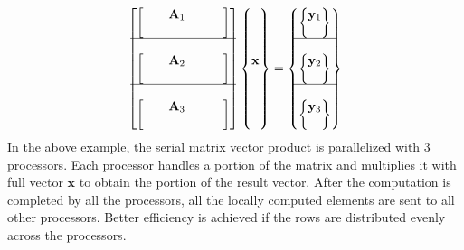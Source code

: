 \documentclass[sigplan,screen]{acmart}
\begin{document}
\begin{equation*}
\begin{bmatrix}
\begin{bmatrix}
& & \mathbf{A}_1& & & \\
& & & & & \\
\end{bmatrix}\\
\hline\\
\begin{bmatrix}
& & \mathbf{A}_2& & & \\
& & & & & \\
\end{bmatrix}\\
\hline\\
\begin{bmatrix}
& & \mathbf{A}_3& & & \\
& & & & & \\
\end{bmatrix}\\
\end{bmatrix}
\begin{Bmatrix}
\\
\\
\\
\mathbf{x}\\
\\
\\
\\
\\	
\end{Bmatrix}
=\begin{Bmatrix}
\begin{Bmatrix}
\mathbf{y}_1\\
\\
\end{Bmatrix}\\
\hline\\
\begin{Bmatrix}
\mathbf{y}_2\\
\\
\end{Bmatrix}\\
\hline\\
\begin{Bmatrix}
\mathbf{y}_3\\
\\
\end{Bmatrix}	
\end{Bmatrix} 
\end{equation*}
In the above example, the serial matrix vector product is parallelized with 3 processors. Each processor handles a portion of the matrix  and multiplies it with full vector $\mathbf{x}$ to obtain the portion of the result vector. After the computation is completed by all the processors, all the locally computed elements are sent to all other processors. Better efficiency is achieved if the rows are distributed evenly across the processors.   
\end{document}
